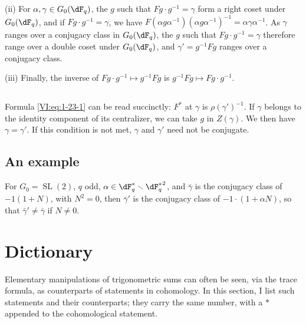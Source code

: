 \documentclass[oneside]{book}
\renewcommand{\setminus}{\smallsetminus}
\theoremstyle{sga-source}
\theoremstyle{sga-source-dash}
\theoremstyle{sga-source-dotdash}
\theoremstyle{sga-source-number-note-dash}
\theoremstyle{sga-source-note-number-dotdash}
\theoremstyle{sga-source-example-dotdash}
\theoremstyle{sga-source-inline-number}
\theoremstyle{sga-source-bare-number}
\theoremstyle{sga-source}
\newcommand{\PrintPage}[1]{}\newcommand{\MathPage}[1]{}\newcommand{\PrintCite}[2]{#1}\newcommand{\var}[3]{#1}
\begin{document}
(ii) For $\alpha,\gamma\in G_0(\dF_q)$, the $g$ such that 
$F g\cdot g^{-1} = \gamma$ form a right coset under $G_0(\dF_q)$, and 
if $F g\cdot g^{-1} = \gamma$, we have 
$F(\alpha g \alpha^{-1})(\alpha g \alpha^{-1})^{-1} = \alpha \gamma\alpha^{-1}$. 
As $\gamma$ ranges over a conjugacy class in $G_0(\dF_q)$, the $g$ 
such that $F g\cdot g^{-1} = \gamma$ therefore range over a double coset under 
$G_0(\dF_q)$, and $\gamma'= g^{-1} F g$ ranges over a conjugacy class. 

(iii) Finally, the inverse of $F g\cdot g^{-1}\mapsto g^{-1} F g$ is 
$g^{-1} F g\mapsto F g\cdot g^{-1}$. 





\subsection{}\label{VI:1-25}

Formula \eqref{VI:eq:1-23-1} can be read succinctly: $F^\ast$ at 
$\gamma$ is $\rho(\gamma')^{-1}$. If $\gamma$ belongs to the identity component 
of its centralizer, we can take $g$ in $Z(\gamma)$. We then have 
$\gamma=\gamma'$. If this condition is not met, $\gamma$ and $\gamma'$ 
need not be conjugate. 





\subsection{An example}\label{VI:1-26}

For $G_0=\operatorname{SL}(2)$, $q$ odd, 
$\alpha\in \dF_q^\ast\setminus {\dF_q^\ast}^2$, and $\bar\gamma$ is the 
conjugacy class of $-1(1+N)$, with $N^2=0$, then $\bar\gamma'$ is the 
conjugacy class of $-1\cdot (1+\alpha N)$, so that $\bar\gamma'\ne \bar\gamma$ 
if $N\ne 0$. 










\PrintPage{183}
\section{Dictionary}\label{VI:2}

Elementary manipulations of trigonometric sums can often 
be seen, via the trace formula, as counterparts of statements 
in cohomology. In this section, I list such statements and their 
counterparts; they carry the same number, with a $\ast$ appended to 
the cohomological statement. 
\end{document}
